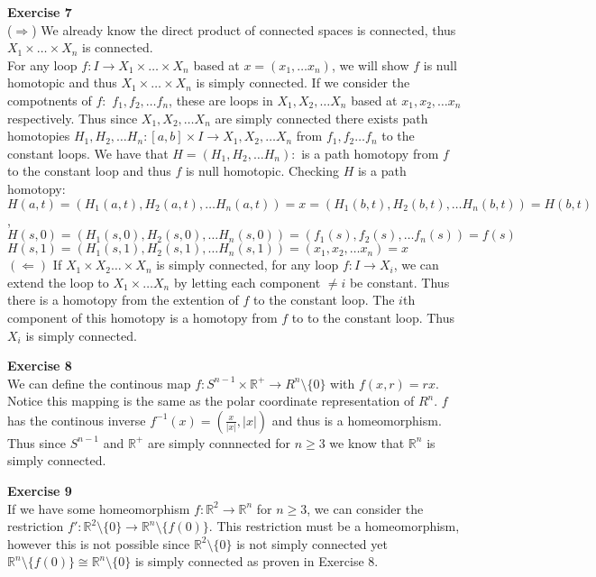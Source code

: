 \documentclass[12pt]{article}
\newenvironment{ques}[1]{\textbf{Exercise #1}\vspace{1 mm}\\ }{\bigskip}
\theoremstyle{definition}
\newcommand{\R}{\mathbb R}
\renewcommand{\b}{\setminus}
\begin{document}
\begin{ques}{7}
	($\Rightarrow$) We already know the direct product of connected spaces is
	connected, thus $X_1 \times \dots \times X_n$ is connected.\\
	For any loop $f: I \to X_1 \times \dots \times X_n$ based at $x = (x_1,
	\dots x_n)$, we will show $f$ is null homotopic and thus $X_1 \times \dots
	\times X_n$ is simply connected. If we consider the compotnents of $f:$
	$f_1, f_2, \dots f_n$, these are loops in $X_1, X_2, \dots X_n$ based at
	$x_1, x_2, \dots x_n$ respectively. Thus since $X_1, X_2, \dots X_n$ are
	simply connected there exists path homotopies $H_1, H_2, \dots H_n : [a,b]
	\times I \to X_1, X_2, \dots X_n$ from $f_1,f_2 \dots f_n$ to the constant
	loops. We have that $H = (H_1, H_2, \dots H_n): $ is a path homotopy from
	$f$ to the constant loop and thus $f$ is null homotopic. Checking $H$ is a
	path homotopy:\\
	$H(a,t) = (H_1(a,t), H_2(a,t), \dots H_n(a,t)) = x = (H_1(b,t), H_2(b,t),
	\dots H_n(b,t)) = H(b,t)$,\\
	$H(s, 0) = (H_1(s,0), H_2(s,0), \dots H_n(s,0)) = (f_1(s),f_2(s), \dots
	f_n(s)) = f(s)$\\
	$H(s, 1) = (H_1(s,1), H_2(s,1), \dots H_n(s,1)) = (x_1,x_2, \dots
	x_n) = x$\\
	$(\Leftarrow)$ If $X_1 \times X_2 \dots \times X_n$ is simply connected,
	for any loop $f:I \to X_i$,  we can extend the loop to $X_1 \times \dots
	X_n$ by letting each component $\neq i$ be constant. Thus there is a homotopy
	from the extention of $f$ to the constant loop. The $i$th component of
	this homotopy is a homotopy from $f$ to to the constant loop. Thus
	$X_i$ is simply connected.

\end{ques}

\begin{ques}{8}
	We can define the continous map $f:S^{n-1} \times \R^+ \to R^n \b \{0\}$
	with $f(x,r) = rx$. Notice this mapping is the same as the polar coordinate
	representation of $R^n$. $f$ has the continous inverse $f^{-1}(x) =
	(\frac{x}{|x|}, |x|)$ and thus is a homeomorphism. Thus since $S^{n-1}$ and
	$\R^+$ are simply connnected for $n \geq 3$ we know that $\R^n$ is simply
	connected.
\end{ques}

\begin{ques}{9}
	If we have some homeomorphism $f:\R^2 \to \R^n$ for $n \geq 3$, we can
	consider the restriction $f':\R^2\b \{0\} \to \R^n\b \{f(0)\}$. This
	restriction must be a homeomorphism, however this is not possible since
	$\R^2 \b \{0\}$ is not simply connected yet $\R^n \b \{f(0)\} \cong \R^n \b
	\{0\}$ is simply connected as proven in Exercise 8. 
\end{ques}
\end{document}
